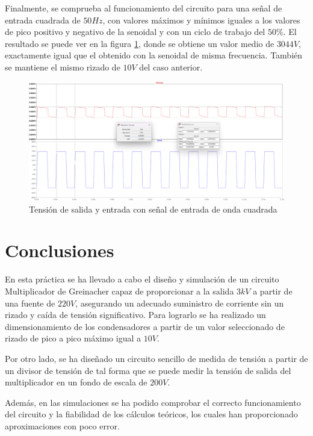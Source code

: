 Finalmente, se comprueba al funcionamiento del circuito para una señal de entrada cuadrada de $50Hz$, con valores máximos y mínimos iguales a los valores
de pico positivo y negativo de la senoidal y con un ciclo de trabajo del $50\%$. El resultado se puede ver en la figura \ref{cuadrada}, donde se obtiene
un valor medio de $3044V$, exactamente igual que el obtenido con la senoidal de misma frecuencia. También se mantiene el mismo rizado de $10V$ del caso anterior.

\begin{figure}[H]
    \centering
    \includegraphics[width=1\textwidth]{Imagenes_alvaro/cuadrada.png}
    \caption{Tensión de salida y entrada con señal de entrada de onda cuadrada}
    \label{cuadrada}
\end{figure}

\section{Conclusiones}

En esta práctica se ha llevado a cabo el diseño y simulación de un 
circuito Multiplicador de Greinacher capaz de proporcionar a la salida 
$3kV$ a partir de una fuente de $220V$, asegurando un adecuado suministro de 
corriente sin un rizado y caída de tensión significativo. Para lograrlo se ha realizado 
un dimensionamiento de los condensadores a partir de un valor seleccionado de rizado de pico a 
pico máximo igual a $10V$.

Por otro lado, se ha diseñado un circuito sencillo de medida de tensión a partir de un divisor 
de tensión de tal forma que se puede medir la tensión de salida del multiplicador en un fondo 
de escala de $200V$.

Además, en las simulaciones se ha podido comprobar el correcto funcionamiento del circuito y la fiabilidad 
de los cálculos teóricos, los cuales han proporcionado aproximaciones con poco error.

